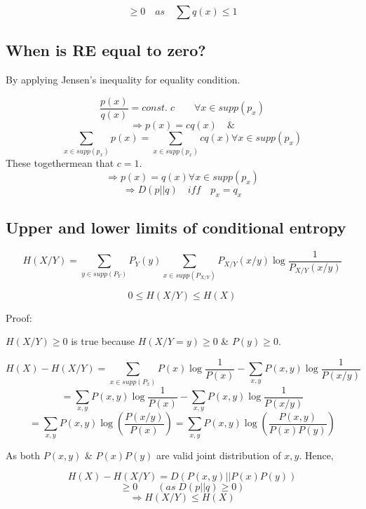 \documentclass{article}
\begin{document}
$$ \geq 0 \quad as \quad \sum q(x) \leq 1$$

\subsection{When is RE equal to zero?}

By applying Jensen's inequality for equality condition.

$$ \frac{p(x)}{q(x)}= const. \; c \qquad \forall x \in supp(p_x)$$
$$ \Rightarrow p(x)=cq(x) \quad \&$$
$$ \sum_{x \in supp(p_x)} p(x)= \sum_{x \in supp(p_x)} cq(x) \forall x \in supp(p_x)$$
These togethermean that $c=1$.
$$\Rightarrow p(x)=q(x) \forall x \in supp(p_x)$$
$$ \Rightarrow D(p||q) \quad iff \quad p_x=q_x$$

\subsection{Upper and lower limits of conditional entropy}

$$ H(X/Y)= \sum_{y \in supp(P_Y)} P_Y(y) \sum_{x \in supp(P_{X/Y})}P_{X/Y}(x/y)\log \frac{1}{P_{X/Y}(x/y)}$$

$$ 0 \leq H(X/Y) \leq H(X)$$

Proof:

$H(X/Y) \geq 0$ is true because $H(X/Y=y)\geq 0$ \& $P(y) \geq 0$.

$$ H(X)-H(X/Y)= \sum_{x \in supp(P_x)}P(x)\log\frac{1}{P(x)}-\sum_{x,y}P(x,y)\log\frac{1}{P(x/y)}$$
$$ =\sum_{x,y}P(x,y)\log\frac{1}{P(x)}-\sum_{x,y}P(x,y)\log\frac{1}{P(x/y)}$$
$$ = \sum_{x,y}P(x,y)\log \left(\frac{P(x/y)}{P(x)}\right)= \sum_{x,y}P(x,y)\log \left(\frac{P(x,y)}{P(x)P(y)}\right)$$

As both $P(x,y)$ \& $P(x)P(y)$ are valid joint distribution of $x,y$. Hence,

$$ H(X)-H(X/Y)= D(P(x,y)||P(x)P(y))$$
$$ \geq 0 \qquad (as\; D(p||q)\geq 0 )$$
$$ \Rightarrow H(X/Y) \leq H(X)$$
\end{document}
